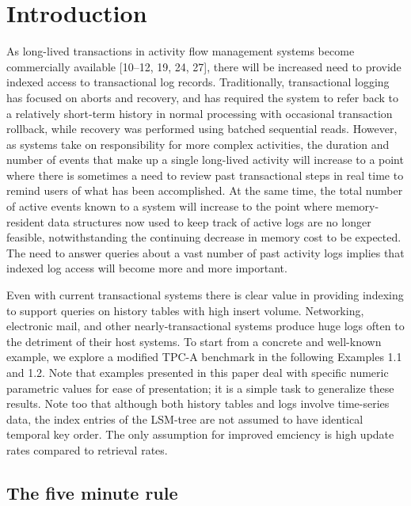 \documentclass[a4paper,11pt,notitlepage,twoside,openright]{article}
\begin{document}
\hypertarget{introduction}{%
\section{Introduction}\label{introduction}}


As long-lived transactions in activity flow management systems become
commercially available {[}10--12, 19, 24, 27{]}, there will be
increased need to provide indexed access to transactional log records.
Traditionally, transactional logging has focused on aborts and recovery,
and has required the system to refer back to a relatively short-term
history in normal processing with occasional transaction rollback, while
recovery was performed using batched sequential reads. However, as
systems take on responsibility for more complex activities, the duration
and number of events that make up a single long-lived activity will
increase to a point where there is sometimes a need to review past
transactional steps in real time to remind users of what has been
accomplished. At the same time, the total number of active events known
to a system will increase to the point where memory-resident data
structures now used to keep track of active logs are no longer feasible,
notwithstanding the continuing decrease in memory cost to be expected.
The need to answer queries about a vast number of past activity logs
implies that indexed log access will become more and more important.

Even with current transactional systems there is clear value in
providing indexing to support queries on history tables with high insert
volume. Networking, electronic mail, and other nearly-transactional
systems produce huge logs often to the detriment of their host systems.
To start from a concrete and well-known example, we explore a modified
TPC-A benchmark in the following Examples 1.1 and 1.2. Note that
examples presented in this paper deal with specific numeric parametric
values for ease of presentation; it is a simple task to generalize these
results. Note too that although both history tables and logs involve
time-series data, the index entries of the LSM-tree are not assumed to
have identical temporal key order. The only assumption for improved
emciency is high update rates compared to retrieval rates.


\hypertarget{the-five-minute-rule}{%
\subsection{The five minute rule}\label{the-five-minute-rule}}
\end{document}
